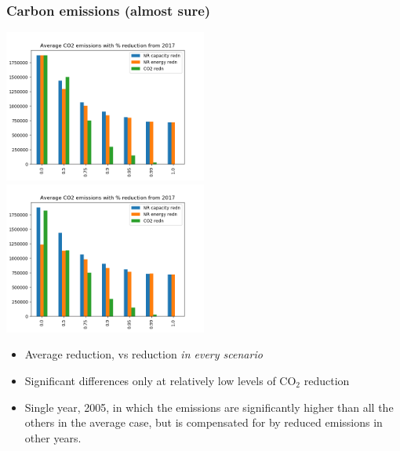 \documentclass[xcolor=dvipsnames]{beamer}
\begin{document}
\begin{frame}
  \frametitle{Carbon emissions (almost sure)}

\includegraphics[width=0.5\textwidth]{includes/TotalCarbonv20.png}
\includegraphics[width=0.5\textwidth]{includes/TotalCarbonASv20.png}

\begin{itemize}
\item Average reduction, vs reduction {\em in every scenario}
\item Significant differences only at relatively low levels of CO$_{2}$
reduction
\item Single year, 2005, in which the emissions are significantly higher
than all the others in the average case, but is compensated for by
reduced emissions in other  years.
\end{itemize}
\end{frame}
\end{document}
